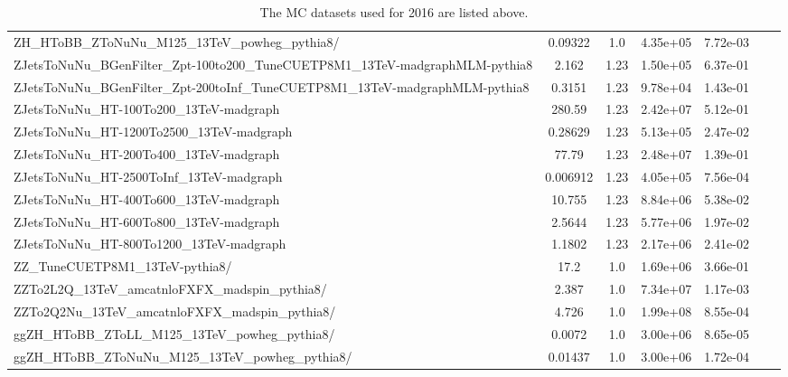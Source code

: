 \begin{table}
\begin{center}
{\begin{tabular}{|l|c|c|c|c|c|c|}
ZH\_HToBB\_ZToNuNu\_M125\_13TeV\_powheg\_pythia8/ & 0.09322 & 1.0 & 4.35e+05 & 7.72e-03 \\
ZJetsToNuNu\_BGenFilter\_Zpt-100to200\_TuneCUETP8M1\_13TeV-madgraphMLM-pythia8 & 2.162 & 1.23 & 1.50e+05 & {\color{orange}6.37e-01} \\
ZJetsToNuNu\_BGenFilter\_Zpt-200toInf\_TuneCUETP8M1\_13TeV-madgraphMLM-pythia8 & 0.3151 & 1.23 & 9.78e+04 & 1.43e-01 \\
ZJetsToNuNu\_HT-100To200\_13TeV-madgraph & 280.59 & 1.23 & 2.42e+07 & {\color{orange}5.12e-01} \\
ZJetsToNuNu\_HT-1200To2500\_13TeV-madgraph & 0.28629 & 1.23 & 5.13e+05 & 2.47e-02 \\
ZJetsToNuNu\_HT-200To400\_13TeV-madgraph & 77.79 & 1.23 & 2.48e+07 & 1.39e-01 \\
ZJetsToNuNu\_HT-2500ToInf\_13TeV-madgraph & 0.006912 & 1.23 & 4.05e+05 & 7.56e-04 \\
ZJetsToNuNu\_HT-400To600\_13TeV-madgraph & 10.755 & 1.23 & 8.84e+06 & 5.38e-02 \\
ZJetsToNuNu\_HT-600To800\_13TeV-madgraph & 2.5644 & 1.23 & 5.77e+06 & 1.97e-02 \\
ZJetsToNuNu\_HT-800To1200\_13TeV-madgraph & 1.1802 & 1.23 & 2.17e+06 & 2.41e-02 \\
ZZ\_TuneCUETP8M1\_13TeV-pythia8/ & 17.2 & 1.0 & 1.69e+06 & {\color{orange}3.66e-01} \\
ZZTo2L2Q\_13TeV\_amcatnloFXFX\_madspin\_pythia8/ & 2.387 & 1.0 & 7.34e+07 & 1.17e-03 \\
ZZTo2Q2Nu\_13TeV\_amcatnloFXFX\_madspin\_pythia8/ & 4.726 & 1.0 & 1.99e+08 & 8.55e-04 \\
ggZH\_HToBB\_ZToLL\_M125\_13TeV\_powheg\_pythia8/ & 0.0072 & 1.0 & 3.00e+06 & 8.65e-05 \\
ggZH\_HToBB\_ZToNuNu\_M125\_13TeV\_powheg\_pythia8/ & 0.01437 & 1.0 & 3.00e+06 & 1.72e-04 \\
\hline 
\end{tabular}} 
\end{center} 
\caption[2016 MC samples]{ 
  The MC datasets used for 2016 are listed above.
}
\label{tab:mc_2016} 
\end{table}

